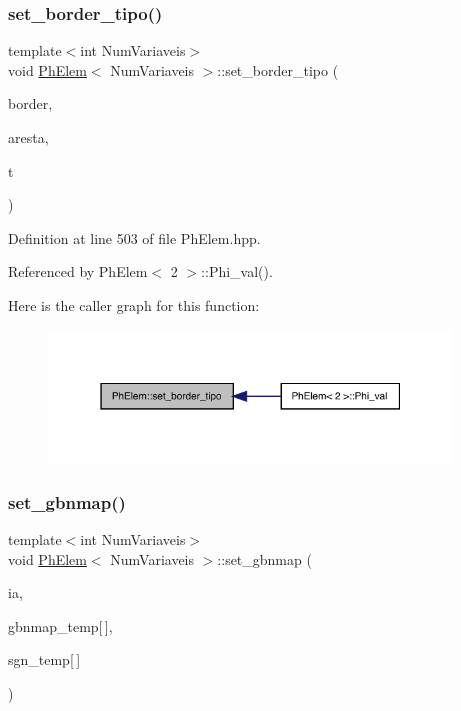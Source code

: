 \subsubsection{\texorpdfstring{set\+\_\+border\+\_\+tipo()}{set\_border\_tipo()}}
{\footnotesize\ttfamily template$<$int Num\+Variaveis$>$ \\
void \hyperlink{classPhElem}{Ph\+Elem}$<$ Num\+Variaveis $>$\+::set\+\_\+border\+\_\+tipo (\begin{DoxyParamCaption}\item[{\hyperlink{structEDGE}{E\+D\+GE} $\ast$}]{border,  }\item[{const int \&}]{aresta,  }\item[{const int \&}]{t }\end{DoxyParamCaption})}



Definition at line 503 of file Ph\+Elem.\+hpp.



Referenced by Ph\+Elem$<$ 2 $>$\+::\+Phi\+\_\+val().

Here is the caller graph for this function\+:
\nopagebreak
\begin{figure}[H]
\begin{center}
\leavevmode
\includegraphics[width=304pt]{classPhElem_aafd112d676dc3e16309e8ec8980f1c97_icgraph}
\end{center}
\end{figure}
\mbox{\label{classPhElem_afba886f63bf7b67bd0a4164eae4dde5b}} 
\subsubsection{\texorpdfstring{set\+\_\+gbnmap()}{set\_gbnmap()}}
{\footnotesize\ttfamily template$<$int Num\+Variaveis$>$ \\
void \hyperlink{classPhElem}{Ph\+Elem}$<$ Num\+Variaveis $>$\+::set\+\_\+gbnmap (\begin{DoxyParamCaption}\item[{const int \&}]{ia,  }\item[{const int}]{gbnmap\+\_\+temp\mbox{[}$\,$\mbox{]},  }\item[{const int}]{sgn\+\_\+temp\mbox{[}$\,$\mbox{]} }\end{DoxyParamCaption})}




